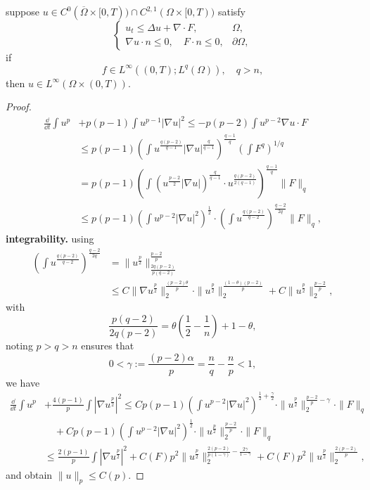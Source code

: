 \begin{lemma}
	suppose $u\in C^0(\overline{\Omega}\times[0,T))\cap C^{2,1}(\Omega\times[0,T))$ satisfy 
\begin{equation*}
	\begin{cases}
		u_t \leq \Delta u + \nabla\cdot F, & \Omega,\\
		\nabla u\cdot n \leq 0, \quad F\cdot n \leq 0, & \partial\Omega,
	\end{cases}
\end{equation*}
if 
\[
	f\in L^\infty((0,T); L^q(\Omega)),\quad q>n,
\]
then
$u\in L^\infty(\Omega\times(0,T))$.
\end{lemma}
\begin{proof}
	\begin{align*}
		\frac{\dd}{\dd t}\int u^p &+ p(p-1)\int u^{p-1}|\nabla u|^2 
		\leq - p(p-2)\int u^{p-2}\nabla u\cdot F\\
		&\leq p(p-1)\left(\int u^{\frac{q(p-2)}{q-1}}|\nabla u|^{\frac{q}{q-1}}\right)^{\frac{q-1}{q}}
			\left(\int F^q\right)^{1/q}\\
		&= p(p-1)\left(\int \left(u^{\frac{p-2}{2}}|\nabla u|\right)^{\frac{q}{q-1}}
			\cdot u^{\frac{q(p-2)}{2(q-1)}}\right)^{\frac{q-1}{q}}\|F\|_q\\
		&\leq p(p-1)\left(\int u^{p-2}|\nabla u|^2\right)^{\frac12}
			\cdot\left(\int u^{\frac{q(p-2)}{q-2}}\right)^{\frac{q-2}{2q}}\|F\|_q,
	\end{align*}
	\textbf{integrability.} using
	\begin{align*}
		\left(\int u^{\frac{q(p-2)}{q-2}}\right)^{\frac{q-2}{2q}}
		&= \|u^{\frac{p}{2}}\|_{\frac{2q(p-2)}{p(q-2)}}^{\frac{p-2}{p}}\\
		&\leq C\|\nabla u^{\frac{p}{2}}\|_2^{\frac{(p-2)\theta}{p}}\cdot\|u^{\frac{p}{2}}\|_2^{\frac{(1-\theta)(p-2)}{p}} + C\|u^{\frac{p}{2}}\|_2^{\frac{p-2}{p}},
	\end{align*}
	with 
	\[
		\frac{p(q-2)}{2q(p-2)} = \theta\left(\frac12-\frac1n\right) + 1-\theta,
	\]
	noting $p>q>n$ ensures that
	\[
		0<\gamma := \frac{(p-2)\alpha}{p} = \frac{n}{q} - \frac{n}{p} < 1,
	\]
	we have 
	\begin{align*}
		\frac{\dd}{\dd t}\int u^p &+ \frac{4(p-1)}{p}\int |\nabla u^{\frac{p}{2}}|^2
		\leq Cp(p-1)\left(\int u^{p-2}|\nabla u|^2\right)^{\frac12+\frac\gamma2}\cdot\|u^{\frac{p}{2}}\|_2^{\frac{p-2}{p} - \gamma}\cdot\|F\|_q \\
		&\quad +Cp(p-1) \left(\int u^{p-2}|\nabla u|^2\right)^{\frac12}\cdot\|u^{\frac{p}{2}}\|_2^{\frac{p-2}{p}}\cdot\|F\|_q \\
		&\leq \frac{2(p-1)}{p}\int |\nabla u^{\frac{p}{2}}|^2 
			+ C(F)p^2\|u^{\frac{p}{2}}\|_2^{\frac{2(p-2)}{p(1-\gamma)}-\frac{2\gamma}{1-\gamma}}
			+ C(F)p^2\|u^{\frac{p}{2}}\|_2^{\frac{2(p-2)}{p}},
	\end{align*}
	and obtain $\|u\|_p\leq C(p)$.


\end{proof}
